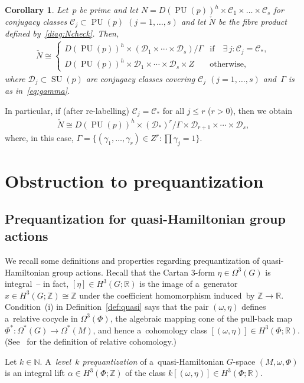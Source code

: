 \documentclass[11pt]{article}
\numberwithin{equation}{section}
\newtheorem{Corollary}[Theorem]{Corollary}
\DeclareMathOperator{\SU}{SU}
\DeclareMathOperator{\PU}{PU}
\begin{document}
\begin{Corollary}
\label{cor:PUpdecomp}
Let~$p$ be prime and let $N= D(\PU(p))^h \times \mathcal{C}_1 \times \dots \times \mathcal{C}_s $ for conjugacy classes
$\mathcal{C}_j \subset \PU(p)$ $(j=1,\ldots,s)$ and let $\check{N}$ be the fibre product defined by~\eqref{diag:Ncheck}.
Then,
\begin{gather*}
\check{N} \cong
\begin{cases}
D(\PU(p))^h \times (\mathcal{D}_1 \times \cdots \times \mathcal{D}_s)/{\Gamma} & \text{if}\quad\exists\, j \colon \mathcal{C}_j=\mathcal{C}_*,
\\
D(\PU(p))^h \times {\mathcal{D}_1 \times \cdots \times \mathcal{D}_s} \times Z & \text{otherwise},
\end{cases}
\end{gather*}
where $\mathcal{D}_j \subset \SU(p)$ are conjugacy classes covering $\mathcal{C}_j$ $(j=1,\ldots,s)$ and~$\Gamma$ is as
in~\eqref{eq:gamma}.
\end{Corollary}

In particular, if (after re-labelling) $\mathcal{C}_j=\mathcal{C}_*$ for all $j\leq r$ ($r>0$), then we obtain
\begin{gather}
\label{eq:splits4PUp}
\check{N} \cong D(\PU(p))^h \times (\mathcal{D}_*)^r/{\Gamma} \times \mathcal{D}_{r+1} \times \cdots \times
\mathcal{D}_s,
\end{gather}
where, in this case, $\Gamma=\{(\gamma_1, \ldots, \gamma_r) \in Z^r \colon \prod \gamma_j=1\}$.

\section{Obstruction to prequantization}\label{sec:main}

\subsection{Prequantization for quasi-Hamiltonian group actions}\label{sec:preq}

We recall some def\/initions and properties regarding prequantization of quasi-Hamiltonian group actions.
Recall that the Cartan $3$-form $\eta \in \Omega^3(G)$ is integral~-- in fact, $[\eta] \in H^3(G;{\mathbb{R}})$ is the
image of a~generator $x\in H^3(G;{\mathbb{Z}})\cong {\mathbb{Z}}$ under the coef\/f\/icient homomorphism induced~by
${\mathbb{Z}} \to {\mathbb{R}}$.
Condition~(i) %
in Def\/inition~\ref{def:quasi} says that the pair $(\omega,\eta)$ def\/ines a~relative
cocycle in $\Omega^3(\Phi)$, the algebraic mapping cone of the pull-back map $\Phi^*\colon \Omega^*(G)\to\Omega^*(M)$,
and hence a~cohomology class $[(\omega,\eta)] \in H^3(\Phi;{\mathbb{R}})$.
(See~\cite[Chapter~I, Section~6]{BottTu} for the def\/inition of relative cohomology.)
\begin{Definition}\label{preq}
Let $k\in {\mathbb{N}}$.
A~\emph{level~$k$ prequantization} of a~quasi-Hamiltonian $G$-space $(M,\omega,\Phi)$ is an integral lift $\alpha\in
H^3(\Phi;{\mathbb{Z}})$ of the class $k[(\omega,\eta)]\in H^3(\Phi;{\mathbb{R}})$.
\end{Definition}
\end{document}
